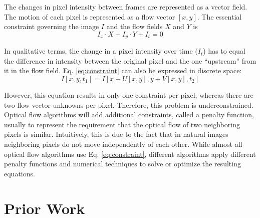 \documentclass[10pt,twocolumn,letterpaper]{article}
\begin{document}
The changes in pixel intensity between frames are represented as a vector field. The motion of each pixel is represented as a flow vector $[x, y]$. The essential constraint governing the image $I$ and the flow fields $X$ and $Y$ is
\begin{equation} \label{eq:constraint}
I_x \cdot X+ I_y \cdot Y + I_t = 0
\end{equation}


In qualitative terms, the change in a pixel intensity over time ($I_t$) has to equal the difference in intensity between the original pixel and the one “upstream” from it in the flow field. Eq. \ref{eq:constraint} can also be expressed in discrete space:
\begin{equation} \label{eq:discrete}
I[x, y, t_1] = I[x + U[x, y], y + V[x, y], t_2]
\end{equation}

However, this equation results in only one constraint per pixel, whereas there are two flow vector unknowns per pixel. Therefore, this problem is underconstrained. \cite{wu} Optical flow algorithms will add additional constraints, called a penalty function, usually to represent the requirement that the optical flow of two neighboring pixels is similar. Intuitively, this is due to the fact that in natural images neighboring pixels do not move independently of each other. While almost all optical flow algorithms use Eq. \ref{eq:constraint}, different algorithms apply different penalty functions and numerical techniques to solve or optimize the resulting equations.

\section{Prior Work}
\end{document}
